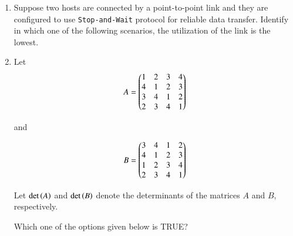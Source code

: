\documentclass[journal,12pt,onecolumn]{IEEEtran}
\theoremstyle{remark}
\begin{document}
\begin{enumerate}
		\item Suppose two hosts are connected by a point-to-point link and they are configured to use \texttt{Stop-and-Wait} protocol for reliable data transfer. Identify in which one of the following scenarios, the utilization of the link is the lowest.
		
\hfill{}
		
		\begin{enumerate}
		\end{enumerate}
		
		\item Let 
		$$A = \begin{pmatrix}1 & 2 & 3 & 4 \\ 4 & 1 & 2 & 3 \\ 3 & 4 & 1 & 2 \\ 2 & 3 & 4 & 1\end{pmatrix}$$
		
		and 
		
		$$B = \begin{pmatrix}3 & 4 & 1 & 2 \\ 4 & 1 & 2 & 3 \\ 1 & 2 & 3 & 4 \\ 2 & 3 & 4 & 1\end{pmatrix}$$
		
		Let $\det\left(A\right)$ and $\det\left(B\right)$ denote the determinants of the matrices $A$ and $B$, respectively.
		
		Which one of the options given below is TRUE?
		
\hfill{}
		
		\begin{enumerate}
			\begin{multicols}{1}
				\item $\det\brak{A} = \det\brak{B}$
				\item $\det\brak{B} = -\det\brak{A}$
				\item $\det\brak{A} = 0$
				\item $\det\brak{AB} = \det\brak{A} + \det\brak{B}$
			\end{multicols}
		\end{enumerate}
		

\end{enumerate}
\end{document}
